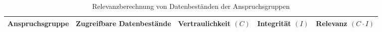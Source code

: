 \documentclass[../../main.tex]{subfiles}
\begin{document}
\begin{table}[H]
\centering
\tablefontsize	

\caption{Relevanzberechnung von Datenbeständen der Anspruchsgruppen }
\label{relevanz_datenbestände}


\begin{tabular}{ |>{\arraybackslash}p{6.1cm}|>{\arraybackslash}p{4.9cm}|>{\centering\arraybackslash}p{2.1cm}|>{\centering\arraybackslash}p{1.3cm}|>{\centering\arraybackslash}p{1.2cm}| }





\hline
\tableheaderbgcolor
\textbf{Anspruchsgruppe} & \textbf{Zugreifbare Datenbestände} & \textbf{Vertraulichkeit \newline $(C)$} & \textbf{Integrität $(I)$} & \textbf{Relevanz $(C \cdot I)$}\\ 
\hline



\end{tabular}
\end{table}
\end{document}
